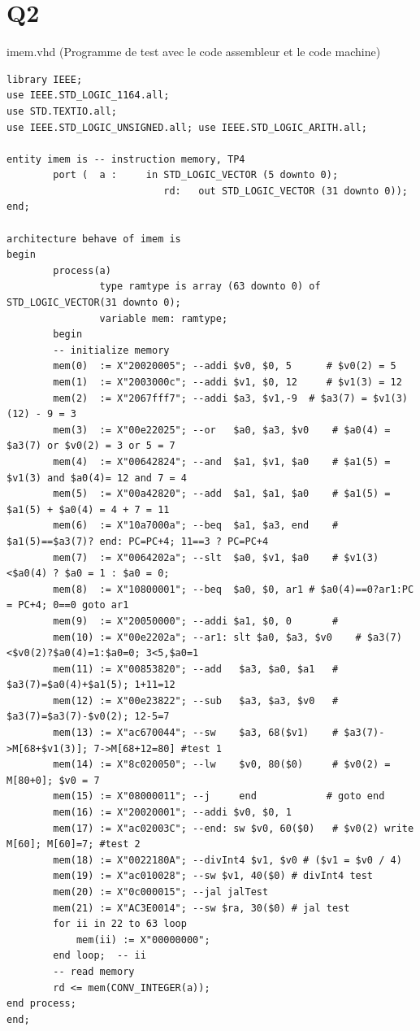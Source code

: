 \documentclass[11pt]{article}
\begin{document}
\section{Q2}
imem.vhd (Programme de test avec le code assembleur et le code machine)
\begin{verbatim}
library IEEE;
use IEEE.STD_LOGIC_1164.all; 
use STD.TEXTIO.all;
use IEEE.STD_LOGIC_UNSIGNED.all; use IEEE.STD_LOGIC_ARITH.all;

entity imem is -- instruction memory, TP4 
        port (	a : 	in STD_LOGIC_VECTOR (5 downto 0);
                           rd:   out STD_LOGIC_VECTOR (31 downto 0));
end;

architecture behave of imem is
begin
        process(a)
                type ramtype is array (63 downto 0) of STD_LOGIC_VECTOR(31 downto 0);
                variable mem: ramtype;
        begin
        -- initialize memory 
        mem(0)  := X"20020005";	--addi $v0, $0, 5	   # $v0(2) = 5
        mem(1)  := X"2003000c";	--addi $v1, $0, 12	   # $v1(3) = 12
        mem(2)  := X"2067fff7";	--addi $a3, $v1,-9 	# $a3(7) = $v1(3)(12) - 9 = 3
        mem(3)  := X"00e22025";	--or   $a0, $a3, $v0	# $a0(4) = $a3(7) or $v0(2) = 3 or 5 = 7
        mem(4)  := X"00642824";	--and  $a1, $v1, $a0	# $a1(5) = $v1(3) and $a0(4)= 12 and 7 = 4
        mem(5)  := X"00a42820";	--add  $a1, $a1, $a0	# $a1(5) = $a1(5) + $a0(4) = 4 + 7 = 11
        mem(6)  := X"10a7000a";	--beq  $a1, $a3, end	# $a1(5)==$a3(7)? end: PC=PC+4; 11==3 ? PC=PC+4
        mem(7)  := X"0064202a";	--slt  $a0, $v1, $a0	# $v1(3)<$a0(4) ? $a0 = 1 : $a0 = 0; 
        mem(8)  := X"10800001";	--beq  $a0, $0, ar1	# $a0(4)==0?ar1:PC = PC+4; 0==0 goto ar1 
        mem(9)  := X"20050000";	--addi $a1, $0, 0		# 
        mem(10) := X"00e2202a";	--ar1: slt $a0, $a3, $v0	# $a3(7)<$v0(2)?$a0(4)=1:$a0=0; 3<5,$a0=1
        mem(11) := X"00853820";	--add 	$a3, $a0, $a1	# $a3(7)=$a0(4)+$a1(5); 1+11=12
        mem(12) := X"00e23822";	--sub 	$a3, $a3, $v0	# $a3(7)=$a3(7)-$v0(2); 12-5=7
        mem(13) := X"ac670044";	--sw 	$a3, 68($v1)	# $a3(7)->M[68+$v1(3)]; 7->M[68+12=80] #test 1
        mem(14) := X"8c020050";	--lw 	$v0, 80($0)		# $v0(2) = M[80+0]; $v0 = 7
        mem(15) := X"08000011";	--j 	end			   # goto end
        mem(16) := X"20020001";	--addi $v0, $0, 1
        mem(17) := X"ac02003C";	--end: sw $v0, 60($0) 	# $v0(2) write M[60]; M[60]=7; #test 2
        mem(18) := X"0022180A"; --divInt4 $v1, $v0 # ($v1 = $v0 / 4)
        mem(19) := X"ac010028"; --sw $v1, 40($0) # divInt4 test
        mem(20) := X"0c000015"; --jal jalTest
        mem(21) := X"AC3E0014"; --sw $ra, 30($0) # jal test
        for ii in 22 to 63 loop
            mem(ii) := X"00000000";
        end loop;  -- ii
        -- read memory
        rd <= mem(CONV_INTEGER(a));
end process;
end;
\end{verbatim}
\end{document}
